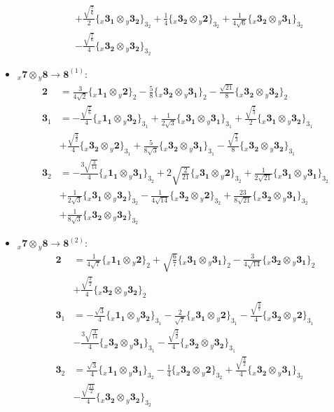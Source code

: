 \documentclass[english]{article}
\newcommand{\rep}[1]{\mathbf{#1}}
\newcommand{\repx}[2]{{}_{#2}\mathbf{#1}}
\newcommand{\tsprodx}[2]{\repx{#1}{x}\otimes\repx{#2}{y}}
\newcommand{\subcgs}[3]{\big\{ \tsprodx{#1}{#2}\big\}^{}_{#3}}
\begin{document}
\begin{itemize}
\begin{align*}
 & +\frac{\sqrt{\frac{7}{6}}}{2}\subcgs{3_{1}}{3_{2}}{3_{2}}+\frac{1}{4}\subcgs{3_{2}}{2}{3_{2}}+\frac{1}{4 \sqrt{6}}\subcgs{3_{2}}{3_{1}}{3_{2}} \\ 
 & -\frac{\sqrt{\frac{7}{6}}}{4}\subcgs{3_{2}}{3_{2}}{3_{2}}
\end{align*}
\item $\tsprodx{7}{8}\to\rep{8}^{(1)}$:
\begin{align*}
\rep{2} & = \frac{3}{4 \sqrt{2}}\subcgs{1_{1}}{2}{2}-\frac{5}{8}\subcgs{3_{2}}{3_{1}}{2}-\frac{\sqrt{21}}{8}\subcgs{3_{2}}{3_{2}}{2}
\\
\rep{3}_{1} & = -\frac{\sqrt{\frac{7}{6}}}{4}\subcgs{1_{1}}{3_{2}}{3_{1}}+\frac{1}{2 \sqrt{3}}\subcgs{3_{1}}{3_{1}}{3_{1}}+\frac{\sqrt{\frac{7}{3}}}{2}\subcgs{3_{1}}{3_{2}}{3_{1}} \\ 
 & +\frac{\sqrt{\frac{3}{2}}}{4}\subcgs{3_{2}}{2}{3_{1}}+\frac{5}{8 \sqrt{3}}\subcgs{3_{2}}{3_{1}}{3_{1}}-\frac{\sqrt{\frac{7}{3}}}{8}\subcgs{3_{2}}{3_{2}}{3_{1}}
\\
\rep{3}_{2} & = -\frac{3 \sqrt{\frac{3}{14}}}{4}\subcgs{1_{1}}{3_{1}}{3_{2}}+2 \sqrt{\frac{2}{21}}\subcgs{3_{1}}{2}{3_{2}}+\frac{1}{2 \sqrt{21}}\subcgs{3_{1}}{3_{1}}{3_{2}} \\ 
 & +\frac{1}{2 \sqrt{3}}\subcgs{3_{1}}{3_{2}}{3_{2}}-\frac{1}{4 \sqrt{14}}\subcgs{3_{2}}{2}{3_{2}}+\frac{23}{8 \sqrt{21}}\subcgs{3_{2}}{3_{1}}{3_{2}} \\ 
 & +\frac{1}{8 \sqrt{3}}\subcgs{3_{2}}{3_{2}}{3_{2}}
\end{align*}
\item $\tsprodx{7}{8}\to\rep{8}^{(2)}$:
\begin{align*}
\rep{2} & = \frac{1}{4 \sqrt{7}}\subcgs{1_{1}}{2}{2}+\sqrt{\frac{6}{7}}\subcgs{3_{1}}{3_{1}}{2}-\frac{3}{4 \sqrt{14}}\subcgs{3_{2}}{3_{1}}{2} \\ 
 & +\frac{\sqrt{\frac{3}{2}}}{4}\subcgs{3_{2}}{3_{2}}{2}
\\
\rep{3}_{1} & = -\frac{\sqrt{3}}{4}\subcgs{1_{1}}{3_{2}}{3_{1}}-\frac{2}{\sqrt{7}}\subcgs{3_{1}}{2}{3_{1}}-\frac{\sqrt{\frac{3}{7}}}{4}\subcgs{3_{2}}{2}{3_{1}} \\ 
 & -\frac{3 \sqrt{\frac{3}{14}}}{4}\subcgs{3_{2}}{3_{1}}{3_{1}}-\frac{\sqrt{\frac{3}{2}}}{4}\subcgs{3_{2}}{3_{2}}{3_{1}}
\\
\rep{3}_{2} & = \frac{\sqrt{3}}{4}\subcgs{1_{1}}{3_{1}}{3_{2}}-\frac{1}{4}\subcgs{3_{2}}{2}{3_{2}}+\frac{\sqrt{\frac{3}{2}}}{4}\subcgs{3_{2}}{3_{1}}{3_{2}} \\ 
 & -\frac{\sqrt{\frac{21}{2}}}{4}\subcgs{3_{2}}{3_{2}}{3_{2}}

\end{align*}
\end{itemize}
\end{document}
